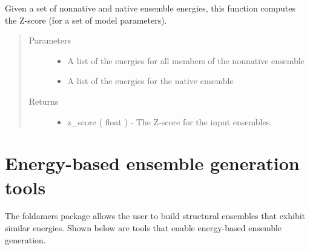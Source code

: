 \documentclass[letterpaper,12pt,english,openany,oneside]{sphinxmanual}
\begin{document}

\begin{fulllineitems}
\label{\detokenize{ensembles:ensembles.ens_build.z_score}}
Given a set of nonnative and native ensemble energies, this function computes the Z-score (for a set of model parameters).
\begin{quote}\begin{description}
\item[{Parameters}] \leavevmode\begin{itemize}
\item {} 
 \textendash{} A list of the energies for all members of the nonnative ensemble

\item {} 
 \textendash{} A list of the energies for the native ensemble

\end{itemize}

\item[{Returns}] \leavevmode
\begin{itemize}
\item {} 
z\_score ( float ) - The Z-score for the input ensembles.

\end{itemize}


\end{description}\end{quote}

\end{fulllineitems}


\newpage


\section{Energy-based ensemble generation tools}
\label{\detokenize{ensembles:energy-based-ensemble-generation-tools}}
The foldamers package allows the user to build structural ensembles that exhibit similar energies.  Shown below are tools that enable energy-based ensemble generation.

\label{\detokenize{ensembles:module-ensembles.ens_build}}
\end{document}
